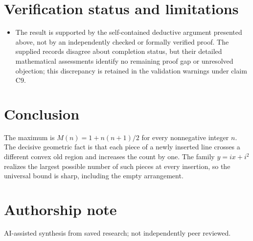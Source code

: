 \documentclass[11pt]{article}
\begin{document}
\section{Verification status and limitations}
\begin{itemize}
\item The result is supported by the self-contained deductive argument presented above, not by an independently checked or formally verified proof. The supplied records disagree about completion status, but their detailed mathematical assessments identify no remaining proof gap or unresolved objection; this discrepancy is retained in the validation warnings under claim C9.
\end{itemize}
\section{Conclusion}
The maximum is $M(n)=1+n(n+1)/2$ for every nonnegative integer $n$. The decisive geometric fact is that each piece of a newly inserted line crosses a different convex old region and increases the count by one. The family $y=ix+i^2$ realizes the largest possible number of such pieces at every insertion, so the universal bound is sharp, including the empty arrangement.

\section*{Authorship note}
AI-assisted synthesis from saved research; not independently peer reviewed.
\end{document}
